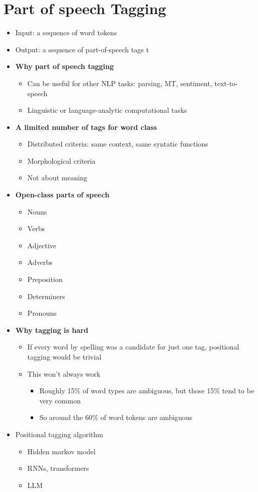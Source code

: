 \section{Part of speech Tagging}
\begin{itemize}
    \item Input: a sequence of word tokens
    \item Output: a sequence of part-of-speech tags t
    \item \textbf{Why part of speech tagging}
    \begin{itemize}
        \item Can be useful for other NLP tasks: parsing, MT, sentiment, text-to-speech
        \item Linguistic or language-analytic computational tasks
    \end{itemize}
    \item \textbf{A limited number of tags for word class}
    \begin{itemize}
        \item Distributed criteria: same context, same syntatic functions
        \item Morphological criteria 
        \item Not about meaning
    \end{itemize}
    \item \textbf{Open-class parts of speech}
    \begin{itemize}
        \item Nouns
        \item Verbs
        \item Adjective
        \item Adverbs
        \item Preposition
        \item Determiners
        \item Pronouns 
    \end{itemize}
    \item \textbf{Why tagging is hard}
    \begin{itemize}
        \item If every word by spelling was a candidate for just one tag, positional tagging would be trivial
        \item This won't always work
        \begin{itemize}
            \item Roughly 15\% of word types are ambiguous, but those 15\% tend to be very common
            \item So around the 60\% of word tokens are ambiguous
        \end{itemize}
    \end{itemize}
    \item Positional tagging algorithm
    \begin{itemize}
        \item Hidden markov model
        \item RNNs, transformers
        \item LLM
    \end{itemize}
\end{itemize}


